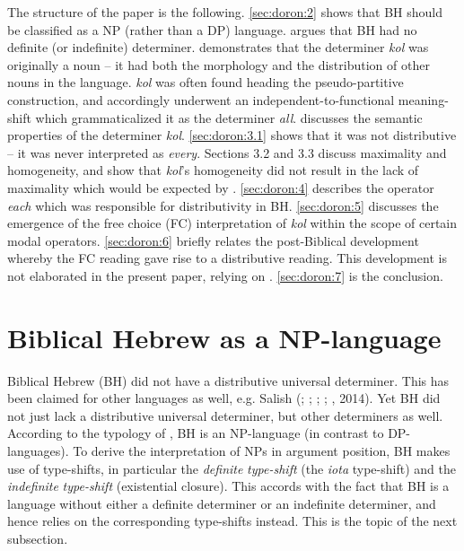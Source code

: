 \documentclass[output=paper]{langsci/langscibook}
\begin{document}
The structure of the paper is the following. \ref{sec:doron:2} shows that BH should be classified as a NP (rather than a DP) language.  argues that BH had no definite (or indefinite) determiner.  demonstrates that the determiner \textit{kol} was originally a noun – it had both the morphology and the distribution of other nouns in the language. \textit{kol} was often found heading the pseudo-partitive construction, and accordingly underwent an independent-to-functional meaning-shift which grammaticalized it as the determiner \textit{all}.  discusses the semantic properties of the determiner \textit{kol}. \ref{sec:doron:3.1} shows that it was not distributive – it was never interpreted as \textit{every}. Sections 3.2 and 3.3 discuss maximality and homogeneity, and show that \textit{kol}’s homogeneity did not result in the lack of maximality which would be expected by \citet{Križ2016}. \ref{sec:doron:4} describes the operator \textit{each} which was responsible for distributivity in BH. \ref{sec:doron:5} discusses the emergence of the free choice (FC) interpretation of \textit{kol} within the scope of certain modal operators. \ref{sec:doron:6} briefly relates the post-Biblical development whereby the FC reading gave rise to a distributive reading. This development is not elaborated in the present paper, relying on \citet{Beck2017}. \ref{sec:doron:7} is the conclusion.

\section{Biblical Hebrew as a NP-language}%
Biblical Hebrew (BH) did not have a distributive universal determiner. This has been claimed for other languages as well, e.g. Salish (\citealt{Jelinek1993}; \citealt{Davis2010}; \citealt{DavisEtAl2014};  \citealt{FintelMatthewson2008}; \citealt{Matthewson2001}, 2014). Yet BH did not just lack a distributive universal determiner, but other determiners as well. According to the typology of \citet{Bošković2008}, BH is an NP-language (in contrast to DP-languages). To derive the interpretation of NPs in argument position, BH makes use of type-shifts, in particular the \textit{definite} \textit{type-shift} (the \textit{iota} type-shift) and the \textit{indefinite} \textit{type-shift} (existential closure). This accords with the fact that BH is a language without either a definite determiner or an indefinite determiner, and hence relies on the corresponding type-shifts instead. This is the topic of the next subsection.
\end{document}
